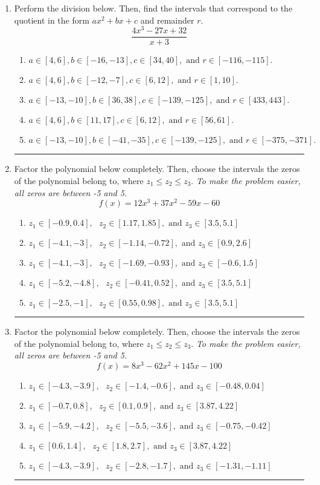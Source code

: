\documentclass[14pt]{extbook}
\newcommand{\litem}[1]{\item#1\hspace*{-1cm}\rule{\textwidth}{0.4pt}}
\begin{document}
\begin{enumerate}
{\begin{enumerate}[label=\Alph*.]
\end{enumerate} }
\litem{
Perform the division below. Then, find the intervals that correspond to the quotient in the form $ax^2+bx+c$ and remainder $r$.\[ \frac{4x^{3} -27 x + 32}{x + 3} \]\begin{enumerate}[label=\Alph*.]
\item \( a \in [4, 6], b \in [-16, -13], c \in [34, 40], \text{ and } r \in [-116, -115]. \)
\item \( a \in [4, 6], b \in [-12, -7], c \in [6, 12], \text{ and } r \in [1, 10]. \)
\item \( a \in [-13, -10], b \in [36, 38], c \in [-139, -125], \text{ and } r \in [433, 443]. \)
\item \( a \in [4, 6], b \in [11, 17], c \in [6, 12], \text{ and } r \in [56, 61]. \)
\item \( a \in [-13, -10], b \in [-41, -35], c \in [-139, -125], \text{ and } r \in [-375, -371]. \)

\end{enumerate} }
\litem{
Factor the polynomial below completely. Then, choose the intervals the zeros of the polynomial belong to, where $z_1 \leq z_2 \leq z_3$. \textit{To make the problem easier, all zeros are between -5 and 5.}\[ f(x) = 12x^{3} +37 x^{2} -59 x -60 \]\begin{enumerate}[label=\Alph*.]
\item \( z_1 \in [-0.9, 0.4], \text{   }  z_2 \in [1.17, 1.85], \text{   and   } z_3 \in [3.5, 5.1] \)
\item \( z_1 \in [-4.1, -3], \text{   }  z_2 \in [-1.14, -0.72], \text{   and   } z_3 \in [0.9, 2.6] \)
\item \( z_1 \in [-4.1, -3], \text{   }  z_2 \in [-1.69, -0.93], \text{   and   } z_3 \in [-0.6, 1.5] \)
\item \( z_1 \in [-5.2, -4.8], \text{   }  z_2 \in [-0.41, 0.52], \text{   and   } z_3 \in [3.5, 5.1] \)
\item \( z_1 \in [-2.5, -1], \text{   }  z_2 \in [0.55, 0.98], \text{   and   } z_3 \in [3.5, 5.1] \)

\end{enumerate} }
\litem{
Factor the polynomial below completely. Then, choose the intervals the zeros of the polynomial belong to, where $z_1 \leq z_2 \leq z_3$. \textit{To make the problem easier, all zeros are between -5 and 5.}\[ f(x) = 8x^{3} -62 x^{2} +145 x -100 \]\begin{enumerate}[label=\Alph*.]
\item \( z_1 \in [-4.3, -3.9], \text{   }  z_2 \in [-1.4, -0.6], \text{   and   } z_3 \in [-0.48, 0.04] \)
\item \( z_1 \in [-0.7, 0.8], \text{   }  z_2 \in [0.1, 0.9], \text{   and   } z_3 \in [3.87, 4.22] \)
\item \( z_1 \in [-5.9, -4.2], \text{   }  z_2 \in [-5.5, -3.6], \text{   and   } z_3 \in [-0.75, -0.42] \)
\item \( z_1 \in [0.6, 1.4], \text{   }  z_2 \in [1.8, 2.7], \text{   and   } z_3 \in [3.87, 4.22] \)
\item \( z_1 \in [-4.3, -3.9], \text{   }  z_2 \in [-2.8, -1.7], \text{   and   } z_3 \in [-1.31, -1.11] \)


\end{enumerate}}
\end{enumerate}
\end{document}
